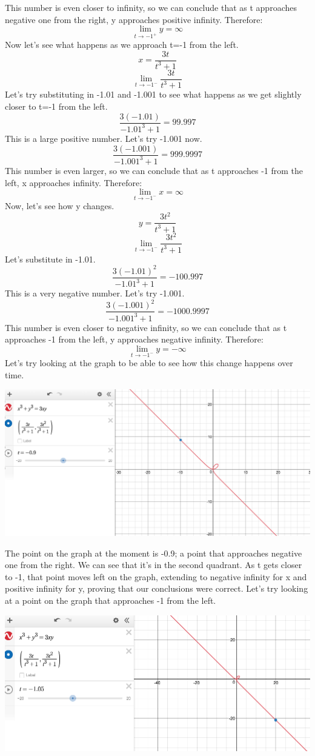 \documentclass[a4paper,openright, 10pt]{article}
\begin{document}
This number is even closer to infinity, so we can conclude that as t approaches negative one from the right, y approaches positive infinity. Therefore:
$$\lim_{t\to-1^+} y=\infty$$
Now let's see what happens as we approach t=-1 from the left.
$$x=\frac{3t}{t^3+1}$$
$$\lim_{t\to-1^-} \frac{3t}{t^3+1}$$
Let's try substituting in -1.01 and -1.001 to see what happens as we get slightly closer to t=-1 from the left.
$$\frac{3(-1.01)}{-1.01^3+1}=99.997$$
This is a large positive number. Let's try -1.001 now.
$$\frac{3(-1.001)}{-1.001^3+1}=999.9997$$
This number is even larger, so we can conclude that as t approaches -1 from the left, x approaches infinity. Therefore:
$$\lim_{t\to-1^-} x=\infty$$
Now, let's see how y changes.
$$y=\frac{3t^2}{t^3+1}$$
$$\lim_{t\to-1^-} \frac{3t^2}{t^3+1}$$
Let's substitute in -1.01.
$$\frac{3(-1.01)^2}{-1.01^3+1}=-100.997$$
This is a very negative number. Let's try -1.001.
$$\frac{3(-1.001)^2}{-1.001^3+1}=-1000.9997$$
This number is even closer to negative infinity, so we can conclude that as t approaches -1 from the left, y approaches negative infinity. Therefore:
$$\lim_{t\to-1^-} y=-\infty$$
Let's try looking at the graph to be able to see how this change happens over time. 
\begin{center}
    \includegraphics[scale=0.45]{graph10}
\end{center}
The point on the graph at the moment is -0.9; a point that approaches negative one from the right. We can see that it's in the second quadrant. As t gets closer to -1, that point moves left on the graph, extending to negative infinity for x and positive infinity for y, proving that our conclusions were correct. Let's try looking at a point on the graph that approaches -1 from the left.
\begin{center}
    \includegraphics[scale=0.45]{graph11}
\end{center}
\end{document}
